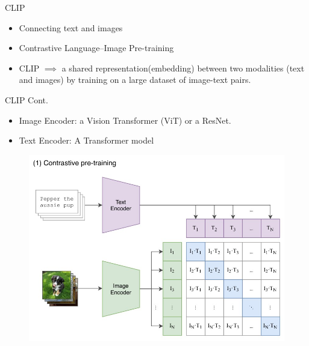\documentclass[serif, aspectratio=169]{beamer}
\begin{document}
\begin{frame}{CLIP}
\begin{itemize}
\item Connecting text and images
\item Contrastive Language–Image Pre-training
\item CLIP $\implies$ a shared representation(embedding) between two modalities (text and images) by training on a large dataset of image-text pairs.
\end{itemize}
\end{frame}

\begin{frame}{CLIP Cont.}
\begin{itemize}
\item Image Encoder: a Vision Transformer (ViT) or a ResNet.
\item Text Encoder: A Transformer model 
\end{itemize}
\begin{figure}[hb]
        \begin{center}
            \includegraphics[keepaspectratio, scale=0.5]{pic/clip-overview.jpg}
        \end{center}
    \end{figure}
\end{frame}
\end{document}
